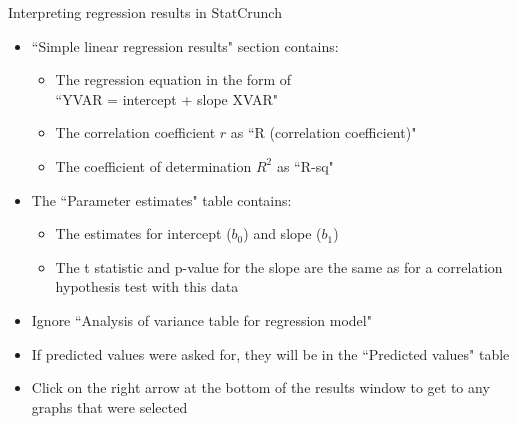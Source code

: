\documentclass[aspectratio=169]{beamer}
\begin{document}
\begin{frame}{Interpreting regression results in StatCrunch}
\begin{block}{}
\large
\begin{itemize}
\item ``Simple linear regression results" section contains:
\begin{itemize}
\item The regression equation in the form of\\ ``YVAR = intercept + slope XVAR"
\item The correlation coefficient $r$ as ``R (correlation coefficient)"
\item The coefficient of determination $R^2$ as ``R-sq"
\end{itemize}
\item The ``Parameter estimates" table contains:
\begin{itemize}
\item The estimates for intercept ($b_0$) and slope ($b_1$)
\item The t statistic and p-value for the slope are the same as for a correlation hypothesis test with this data
\end{itemize}
\item Ignore ``Analysis of variance table for regression model"
\item If predicted values were asked for, they will be in the ``Predicted values" table
\item Click on the right arrow at the bottom of the results window to get to any graphs that were selected
\end{itemize}
\end{block}
\end{frame}
\end{document}
